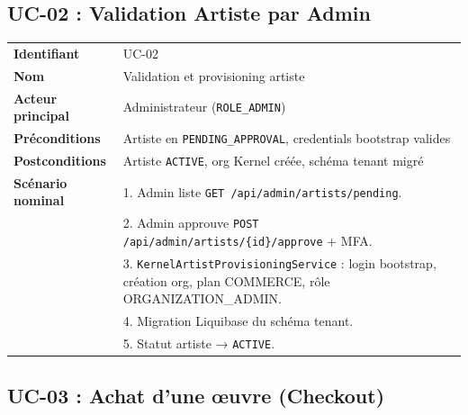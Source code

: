 \subsection{UC-02 : Validation Artiste par Admin}

\begin{table}[h]
  \centering
  \small
  \begin{tabular}{@{}p{3.5cm}p{10cm}@{}}
    \toprule
    \textbf{Identifiant} & UC-02 \\
    \textbf{Nom} & Validation et provisioning artiste \\
    \textbf{Acteur principal} & Administrateur (\texttt{ROLE\_ADMIN}) \\
    \textbf{Préconditions} & Artiste en \texttt{PENDING\_APPROVAL}, credentials bootstrap valides \\
    \textbf{Postconditions} & Artiste \texttt{ACTIVE}, org Kernel créée, schéma tenant migré \\
    \midrule
    \textbf{Scénario nominal} &
    1. Admin liste \texttt{GET /api/admin/artists/pending}.\\
    & 2. Admin approuve \texttt{POST /api/admin/artists/\{id\}/approve} + MFA.\\
    & 3. \texttt{KernelArtistProvisioningService} : login bootstrap, création org, plan COMMERCE, rôle ORGANIZATION\_ADMIN.\\
    & 4. Migration Liquibase du schéma tenant.\\
    & 5. Statut artiste → \texttt{ACTIVE}. \\
    \bottomrule
  \end{tabular}
\end{table}

\subsection{UC-03 : Achat d'une œuvre (Checkout)}

